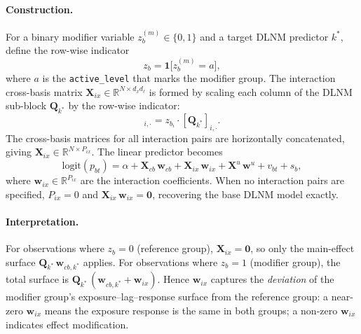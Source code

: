 \documentclass[12pt,a4paper]{article}
\begin{document}
\paragraph{Construction.}
For a binary modifier variable $z_b^{(m)} \in \{0,1\}$ and a target DLNM predictor $k^*$, define the row-wise indicator
\begin{equation}
  z_{b} = \mathbf{1}\!\bigl[z_b^{(m)} = a\bigr],
\end{equation}
where $a$ is the \texttt{active\_level} that marks the modifier group. The interaction cross-basis matrix $\mathbf{X}_{ix} \in \mathbb{R}^{N \times d_{x} d_{\ell}}$ is formed by scaling each column of the DLNM sub-block $\mathbf{Q}_{k^*}$ by the row-wise indicator:
\begin{equation}
  [\mathbf{X}_{ix}]_{i,\cdot} = z_{b_i}\cdot [\mathbf{Q}_{k^*}]_{i,\cdot}.
\end{equation}
The cross-basis matrices for all interaction pairs are horizontally concatenated, giving $\mathbf{X}_{ix} \in \mathbb{R}^{N \times P_{ix}}$.
The linear predictor becomes
\begin{equation}
  \text{logit}(p_{bt}) = \alpha
  + \mathbf{X}_{cb}\,\mathbf{w}_{cb}
  + \mathbf{X}_{ix}\,\mathbf{w}_{ix}
  + \mathbf{X}^u\,\mathbf{w}^u
  + v_{bt} + s_b,
\end{equation}
where $\mathbf{w}_{ix} \in \mathbb{R}^{P_{ix}}$ are the interaction coefficients. When no interaction pairs are specified, $P_{ix} = 0$ and $\mathbf{X}_{ix}\,\mathbf{w}_{ix} = \mathbf{0}$, recovering the base DLNM model exactly.

\paragraph{Interpretation.}
For observations where $z_{b} = 0$ (reference group), $\mathbf{X}_{ix} = \mathbf{0}$, so only the main-effect surface $\mathbf{Q}_{k^*}\,\mathbf{w}_{cb,k^*}$ applies. For observations where $z_{b} = 1$ (modifier group), the total surface is $\mathbf{Q}_{k^*}\,(\mathbf{w}_{cb,k^*} + \mathbf{w}_{ix})$. Hence $\mathbf{w}_{ix}$ captures the \emph{deviation} of the modifier group's exposure--lag--response surface from the reference group: a near-zero $\mathbf{w}_{ix}$ means the exposure response is the same in both groups; a non-zero $\mathbf{w}_{ix}$ indicates effect modification.
\end{document}
